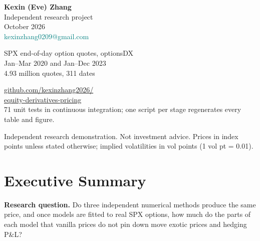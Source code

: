 \documentclass[10pt,letterpaper]{article}
\newcommand{\kicker}[2][accent]{{\color{#1}\footnotesize\bfseries\textls{\MakeUppercase{#2}}}}
\begin{document}
\begin{minipage}[t]{0.31\textwidth}\raggedright
\kicker{Author}\par\vspace{3pt}
\small\textbf{Kexin (Eve) Zhang}\\
Independent research project\\
October 2026\\
\textcolor{teal}{kexinzhang0209@gmail.com}

\vspace{12pt}
\kicker{Data}\par\vspace{3pt}
\small SPX end-of-day option quotes, optionsDX\\
Jan--Mar 2020 and Jan--Dec 2023\\
4.93 million quotes, 311 dates

\vspace{12pt}
\kicker{Code}\par\vspace{3pt}
\small \href{https://github.com/kexinzhang2026/equity-derivatives-pricing}{\color{teal}github.com/kexinzhang2026/\\equity-derivatives-pricing}\\[2pt]
71 unit tests in continuous integration; one script per stage regenerates every table and figure.
\end{minipage}

\vfill
{\color{muted}\scriptsize Independent research demonstration. Not investment advice. Prices in index points unless stated otherwise; implied
volatilities in vol points (1 vol pt = 0.01).\par}
\newpage

\section*{Executive Summary}\label{sec:exec}

\begin{callout}
\textbf{\color{navy}Research question.} Do three independent numerical methods produce the same price, and once
models are fitted to real SPX options, how much do the parts of each model that vanilla prices do not pin down
move exotic prices and hedging P\&L?
\end{callout}
\end{document}
